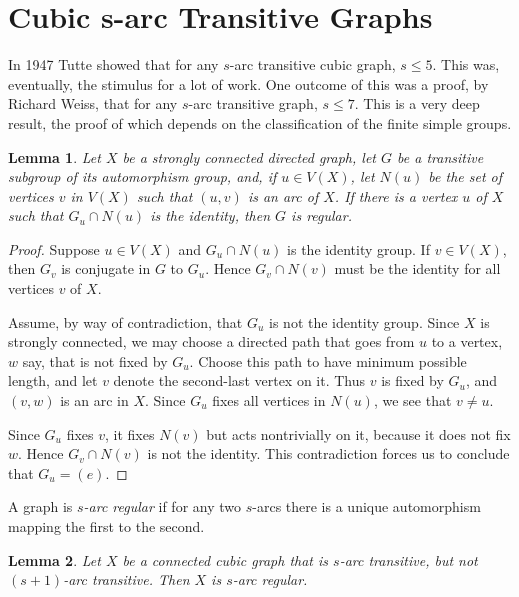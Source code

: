 \documentclass[12pt,a4paper,openany]{book}
\newtheorem{lemma}{Lemma}[section]
\begin{document}
\section{ Cubic s-arc Transitive Graphs}

In 1947 Tutte showed that for any $s$-arc transitive cubic graph, $s \leq 5$. This was, eventually, the stimulus for a lot of work. One outcome of this was a proof, by Richard Weiss, that for any $s$-arc transitive graph, $s \leq 7$. This is a very deep result, the proof of which depends on the classification of the finite simple groups.



\begin{lemma}
Let $X$ be a strongly connected directed graph, let $G$ be a transitive subgroup of its automorphism group, and, if $u \in V(X)$, let $N(u)$ be the set of vertices $v$ in $V(X)$ such that $(u, v)$ is an arc of $X$. If there is a vertex $u$ of $X$ such that $G_u \cap N(u)$ is the identity, then $G$ is regular.
\end{lemma}

\begin{proof}
Suppose $u \in V(X)$ and $G_u \cap N(u)$ is the identity group. If $v \in V(X)$, then $G_v$ is conjugate in $G$ to $G_u$. Hence $G_v \cap N(v)$ must be the identity for all vertices $v$ of $X$.

Assume, by way of contradiction, that $G_u$ is not the identity group. Since $X$ is strongly connected, we may choose a directed path that goes from $u$ to a vertex, $w$ say, that is not fixed by $G_u$. Choose this path to have minimum possible length, and let $v$ denote the second-last vertex on it. Thus $v$ is fixed by $G_u$, and $(v, w)$ is an arc in $X$. Since $G_u$ fixes all vertices in $N(u)$, we see that $v \neq u$.

Since $G_u$ fixes $v$, it fixes $N(v)$ but acts nontrivially on it, because it does not fix $w$. Hence $G_v \cap N(v)$ is not the identity. This contradiction forces us to conclude that $G_u = (e)$.
\end{proof}

A graph is \emph{$s$-arc regular} if for any two $s$-arcs there is a unique automorphism mapping the first to the second.

\begin{lemma}
Let $X$ be a connected cubic graph that is $s$-arc transitive, but not $(s + 1)$-arc transitive. Then $X$ is $s$-arc regular.
\end{lemma}
\end{document}
